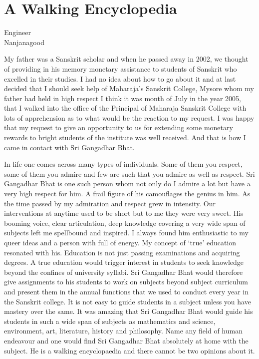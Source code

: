 \chapter{A Walking Encyclopedia}

\begin{center}
Engineer\\
Nanjanagood
\addrule
\end{center}

My father was a Sanskrit scholar and when he passed away in 2002, we thought of providing in his memory monetary assistance to students of Sanskrit who excelled in their studies. I had no idea about how to go about it and at last decided that I should seek help of Maharaja’s Sanskrit College, Mysore whom my father had held in high respect I think it was month of July in the year 2005, that I walked into the office of the Principal of Maharaja Sanskrit College with lots of apprehension as to what would be the reaction to my request. I was happy that my request to give an opportunity to us for extending some monetary rewards to bright students of the institute was well received. And that is how I came in contact with Sri Gangadhar Bhat.

In life one comes across many types of individuals. Some of them you respect, some of them you admire and few are such that you admire as well as respect. Sri Gangadhar Bhat is one such person whom not only do I admire a lot but have a very high respect for him. A frail figure of his camouflages the genius in him. As the time passed by my admiration and respect grew in intensity. Our interventions at anytime used to be short but to me they were very sweet. His booming voice, clear articulation, deep knowledge covering a very wide span of subjects left me spellbound and inspired. I always found him enthusiastic to my queer ideas and a person with full of energy. My concept of ‘true’ education resonated with his. Education is not just passing examinations and acquiring degrees. A true education would trigger interest in students to seek knowledge beyond the confines of university syllabi. Sri Gangadhar Bhat would therefore give assignments to his students to work on subjects beyond subject curriculum and present them in the annual functions that we used to conduct every year in the Sanskrit college. It is not easy to guide students in a subject unless you have mastery over the same. It was amazing that Sri Gangadhar Bhat would guide his students in such a wide span of subjects as mathematics and science, environment, art, literature, history and philosophy. Name any field of human endeavour and one would find Sri Gangadhar Bhat absolutely at home with the subject. He is a walking encyclopaedia and there cannot be two opinions about it. 	

